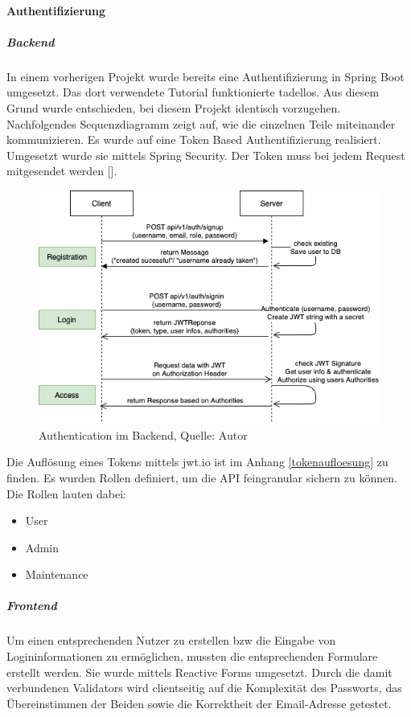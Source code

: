 \paragraph{Authentifizierung}
\subparagraph{Backend}
 In einem vorherigen Projekt wurde bereits eine Authentifizierung in Spring Boot umgesetzt. Das dort verwendete Tutorial funktionierte tadellos. Aus diesem Grund wurde entschieden, bei diesem Projekt identisch vorzugehen. Nachfolgendes Sequenzdiagramm zeigt auf, wie die einzelnen Teile miteinander kommunizieren. Es wurde auf eine Token Based Authentifizierung realisiert. Umgesetzt wurde sie mittels Spring Security. Der Token muss bei jedem Request mitgesendet werden [\cite{authAPISpring}].  
  
\begin{figure}[H]
  	\centering
  	\includegraphics[scale=0.6]{images/Authentication.PNG}
  	\caption[Authentication im Backend]{Authentication im Backend, Quelle: Autor}
  	\label{img: AuthenticationBackend}
\end{figure} 

Die Auflösung eines Tokens mittels jwt.io ist im Anhang \ref{tokenaufloesung} zu finden. 
Es wurden Rollen definiert, um die API feingranular sichern zu können. Die Rollen lauten dabei: 

\begin{itemize}
	\item User
	\item Admin
	\item Maintenance
\end{itemize}

\subparagraph{Frontend}
Um einen entsprechenden Nutzer zu erstellen \ac{bzw} die Eingabe von Logininformationen zu ermöglichen, mussten die entsprechenden Formulare erstellt werden. Sie wurde mittels Reactive Forms umgesetzt. Durch die damit verbundenen Validators wird clientseitig auf die Komplexität des Passworts, das Übereinstimmen der Beiden sowie die Korrektheit der Email-Adresse getestet. 

